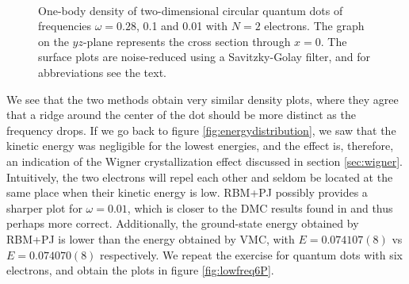 \begin{figure}
	\centering
	\captionsetup[subfigure]{labelformat=empty}
	\hspace{0.1cm}
	\hspace{-0.cm}
	\hspace{-0.cm}
	\\ [-0.cm]
	
	\hspace{0.1cm}
	\hspace{-0.cm}
	\hspace{-0.cm}
	
	\caption{One-body density of two-dimensional circular quantum dots of frequencies $\omega=0.28$, 0.1 and 0.01 with $N=2$ electrons. The graph on the $yz$-plane represents the cross section through $x=0$. The surface plots are noise-reduced using a Savitzky-Golay filter, and for abbreviations see the text.}
	\label{fig:lowfreq2P}
\end{figure}

We see that the two methods obtain very similar density plots, where they agree that a ridge around the center of the dot should be more distinct as the frequency drops. If we go back to figure \eqref{fig:energydistribution}, we saw that the kinetic energy was negligible for the lowest energies, and the effect is, therefore, an indication of the Wigner crystallization effect discussed in section \ref{sec:wigner}. Intuitively, the two electrons will repel each other and seldom be located at the same place when their kinetic energy is low. RBM+PJ possibly provides a sharper plot for $\omega=0.01$, which is closer to the DMC results found in \citet{hogberget_quantum_2013} and thus perhaps more correct. Additionally, the ground-state energy obtained by RBM+PJ is lower than the energy obtained by VMC, with $E=0.074107(8)$ vs $E=0.074070(8)$ respectively. We repeat the exercise for quantum dots with six electrons, and obtain the plots in figure \eqref{fig:lowfreq6P}.

